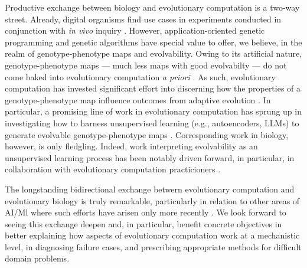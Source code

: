 Productive exchange between biology and evolutionary computation is a two-way street.
Already, digital organisms find use cases in experiments conducted in conjunction with \textit{in vivo} inquiry \citep{TODO}.
However, application-oriented genetic programming and genetic algorithms have special value to offer, we believe, in the realm of genotype-phenotype maps and evolvability.
Owing to its artificial nature, genotype-phenotype maps --- much less maps with good evolvabilty --- do not come baked into evolutionary computation \textit{a priori} \citep{kirschner1998evolvability}.
As such, evolutionary computation has invested significant effort into discerning how the properties of a genotype-phenotype map influence outcomes from adaptive evolution \citep{TODO}.
In particular, a promising line of work in evolutionary computation has sprung up in investigating how to harness unsupervised learning (e.g., autoencoders, LLMs) to generate evolvable genotype-phenotype maps \citep{moreno2018understanding,bradley2024openelm,wittenberg2023denoising,MORECITES}.
Corresponding work in biology, however, is only fledgling.
Indeed, work interpreting evolvability as an unsupervised learning process has been notably driven forward, in particular, in collaboration with evolutionary computation practicioners \citep{kouvaris2017evolution,szilagyi2020phenotypes}.

The longstanding bidirectional exchange betwern evolutionary computation and evolutionary biology is truly remarkable, particularly in relation to other areas of AI/Ml where such efforts have arisen only more recently \citep{marblestone2016toward,richards2019deep}.
We look forward to seeing this exchange deepen and, in particular, benefit concrete objectives in better explaining how aspects of evolutionary computation work at a mechanistic level, in diagnosing failure cases, and prescribing appropriate methods for difficult domain problems.
